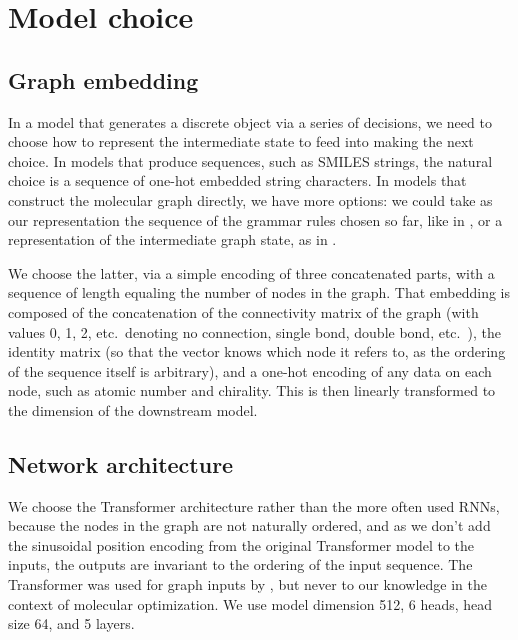 \documentclass{article}
\begin{document}


\section{Model choice}\label{sec:model}
\subsection{Graph embedding}
In a model that generates a discrete object via a series of decisions, we need to choose how to represent the intermediate state to feed into making the next choice. In models that produce sequences, such as SMILES strings, the natural choice is a sequence of one-hot embedded string characters. In models that construct the molecular graph directly, we have more options: we could take as our representation the sequence of the grammar rules chosen so far, like in \cite{kusner2017, kraev2018}, or a representation of the intermediate graph state, as in \cite{you2018}.

We choose the latter, via a simple encoding of three concatenated parts, with a sequence of length equaling the number of nodes in the graph. That embedding is composed of the concatenation of the connectivity matrix of the graph (with values 0, 1, 2, etc.~denoting no connection, single bond, double bond, etc.~), the identity matrix (so that the vector knows which node it refers to, as the ordering of the sequence itself is arbitrary), and a one-hot encoding of any data on each node, such as atomic number and chirality. This is then linearly transformed to the dimension of the downstream model.

\subsection{Network architecture}
We choose the Transformer architecture \cite{vaswani2017} rather than the more often used RNNs, because the nodes in the graph are not naturally ordered, and as we don't add the sinusoidal position encoding from the original Transformer model to the inputs, the outputs are invariant to the ordering of the input sequence. The Transformer was used for graph inputs by \cite{kool2018}, but never to our knowledge in the context of molecular optimization. We use model dimension 512, 6 heads, head size 64, and 5 layers.
\end{document}
